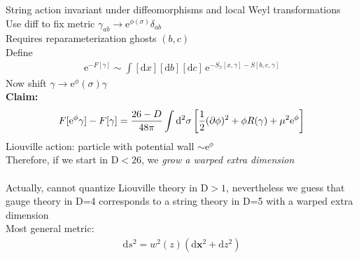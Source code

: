 \documentclass[12pt]{article}
\begin{document}
String action invariant under diffeomorphisms and local Weyl transformations\\
Use diff to fix metric $\gamma_{ab}\to \mathrm e^{\phi(\sigma)} \delta_{ab}$\\
Requires reparameterization ghosts $(b,c)$\\
Define
\begin{eqnarray}
\mathrm e^{-F[\gamma]}\sim \int [\mathrm d x][\mathrm d b][\mathrm d c]\,\mathrm e^{-S_x[x,\gamma] -S[b,c,\gamma]}
\end{eqnarray}
Now shift $\gamma \to \mathrm e^\phi(\sigma) \gamma$\\
{\bf Claim:}
\begin{eqnarray}
F[\mathrm e^\phi \gamma]-F[ \gamma] =  {26-D\over 48\pi}\int \mathrm d^2 \sigma \left[ \frac 12 (\partial \phi)^2+\phi R(\gamma) +\mu^2 \mathrm e^\phi\right]
\end{eqnarray}
Liouville action: particle with potential wall $\sim \mathrm e^\phi$\\
Therefore, if we start in D$<26$, we {\em grow a warped extra dimension} \\
\\
Actually, cannot quantize Liouville theory in D$>1$, nevertheless we guess that gauge theory in D=4 corresponds to a string theory in D=5 with a warped extra dimension\\
Most general metric:
\begin{eqnarray}
\label{warped}
\mathrm ds^2 = w^2(z) \left( \mathrm d\mathbf x^2 + \mathrm d z^2\right)
\end{eqnarray}

\end{document}
